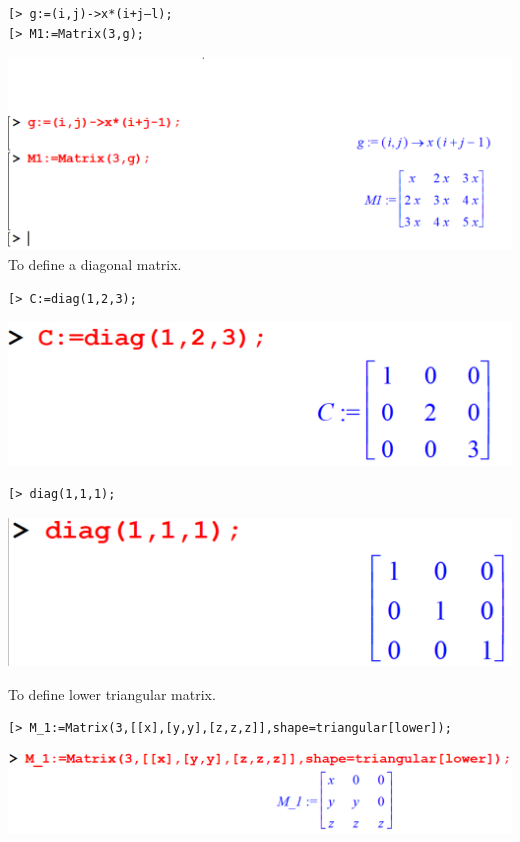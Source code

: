 \documentclass[
]{book}
\theoremstyle{definition}
\theoremstyle{definition}
\theoremstyle{definition}
\theoremstyle{definition}
\theoremstyle{remark}
\begin{document}
\begin{verbatim}
[> g:=(i,j)->x*(i+j—l);
[> M1:=Matrix(3,g);
\end{verbatim}

\includegraphics{figures/Lesson 4/fig8.png}
To define a diagonal matrix.

\begin{verbatim}
[> C:=diag(1,2,3);
\end{verbatim}

\includegraphics{figures/Lesson 4/fig16.png}

\begin{verbatim}
[> diag(1,1,1);
\end{verbatim}

\includegraphics{figures/Lesson 4/fig17.png}

To define lower triangular matrix.

\begin{verbatim}
[> M_1:=Matrix(3,[[x],[y,y],[z,z,z]],shape=triangular[lower]);
\end{verbatim}

\includegraphics{figures/Lesson 4/fig18.png}
\end{document}

